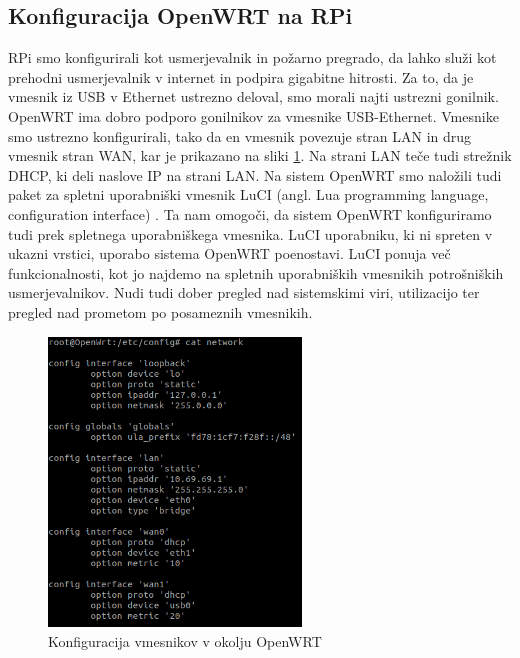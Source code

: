\documentclass[a4paper, 12pt]{book}
\begin{document}
\subsection{Konfiguracija OpenWRT na RPi}
RPi smo konfigurirali kot usmerjevalnik in požarno pregrado, da lahko služi kot prehodni usmerjevalnik v internet in podpira gigabitne hitrosti. Za to, da je vmesnik iz USB v Ethernet ustrezno deloval, smo morali najti ustrezni gonilnik. OpenWRT ima dobro podporo gonilnikov za vmesnike USB-Ethernet. Vmesnike smo ustrezno konfigurirali, tako da en vmesnik povezuje stran LAN in drug vmesnik stran WAN, kar je prikazano na sliki \ref{OpenWRTconfig}. Na strani LAN teče tudi strežnik DHCP, ki deli naslove IP na strani LAN. Na sistem OpenWRT smo naložili tudi paket za spletni uporabniški vmesnik LuCI (angl. Lua programming language, configuration interface) \cite{noauthor_luci_nodate}. Ta nam omogoči, da sistem OpenWRT konfiguriramo tudi prek spletnega uporabniškega vmesnika. LuCI uporabniku, ki ni spreten v ukazni vrstici, uporabo sistema OpenWRT poenostavi. LuCI ponuja več funkcionalnosti, kot jo najdemo na spletnih uporabniških vmesnikih potrošniških usmerjevalnikov. Nudi tudi dober pregled nad sistemskimi viri, utilizacijo ter pregled nad prometom po posameznih vmesnikih.

\begin{figure}[h]
\begin{center}
\includegraphics[width=0.6\textwidth]{fotografije/openWRTconfig.png}
\end{center}
\caption{Konfiguracija vmesnikov v okolju OpenWRT \cite{rvidmar}}
\label{OpenWRTconfig}
\end{figure}
\end{document}

